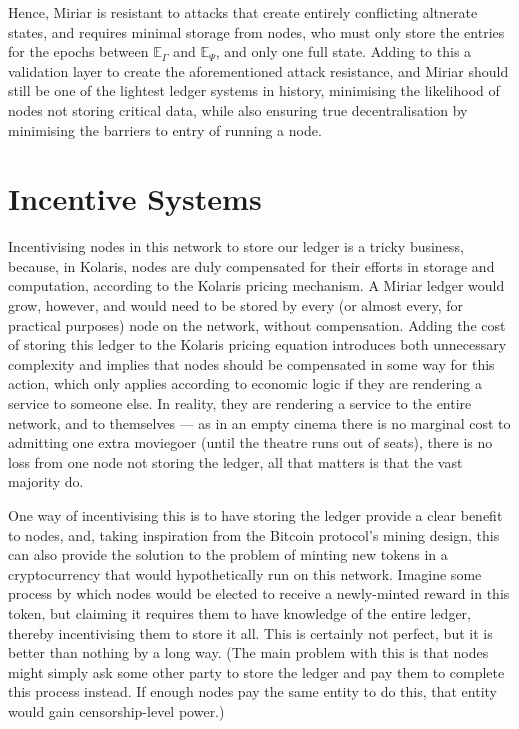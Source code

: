\documentclass{extreport}
\begin{document}
Hence, Miriar is resistant to attacks that create entirely conflicting altnerate states, and requires minimal storage from nodes, who must only store the entries for the epochs between \(\mathbb{E}_\Gamma\) and \(\mathbb{E}_\Psi\), and only one full state. Adding to this a validation layer to create the aforementioned attack resistance, and Miriar should still be one of the lightest ledger systems in history, minimising the likelihood of nodes not storing critical data, while also ensuring true decentralisation by minimising the barriers to entry of running a node.

\chapter{Incentive Systems}
\label{sec:org66e610c}

Incentivising nodes in this network to store our ledger is a tricky business, because, in Kolaris, nodes are duly compensated for their efforts in storage and computation, according to the Kolaris pricing mechanism. A Miriar ledger would grow, however, and would need to be stored by every (or almost every, for practical purposes) node on the network, without compensation. Adding the cost of storing this ledger to the Kolaris pricing equation introduces both unnecessary complexity and implies that nodes should be compensated in some way for this action, which only applies according to economic logic if they are rendering a service to someone else. In reality, they are rendering a service to the entire network, and to themselves --- as in an empty cinema there is no marginal cost to admitting one extra moviegoer (until the theatre runs out of seats), there is no loss from one node not storing the ledger, all that matters is that the vast majority do.

One way of incentivising this is to have storing the ledger provide a clear benefit to nodes, and, taking inspiration from the Bitcoin protocol's mining design, this can also provide the solution to the problem of minting new tokens in a cryptocurrency that would hypothetically run on this network. Imagine some process by which nodes would be elected to receive a newly-minted reward in this token, but claiming it requires them to have knowledge of the entire ledger, thereby incentivising them to store it all. This is certainly not perfect, but it is better than nothing by a long way. (The main problem with this is that nodes might simply ask some other party to store the ledger and pay them to complete this process instead. If enough nodes pay the same entity to do this, that entity would gain censorship-level power.)
\end{document}
